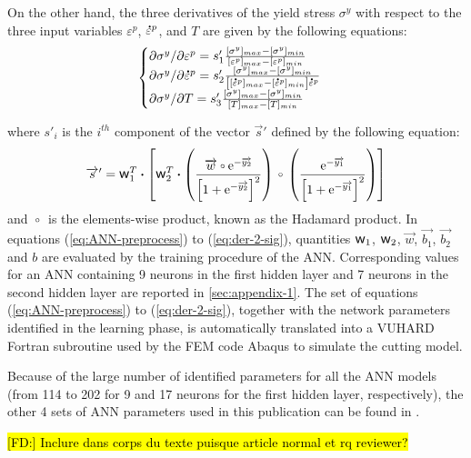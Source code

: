 \documentclass[preprint,12pt,times]{elsarticle}
\newcommand{\e}[1]{\mbox{\ensuremath{\mathrm{e}^{#1}}}}
\newcommand{\dotp}{\boldsymbol{\cdot}}
\newcommand{\w}{\mbox{\large\ensuremath{\mathsf{w}}}}
\newcommand{\mdot}[1]{\accentset{\mbox{\bfseries .}}{#1}} %
\newcommand{\ccirc}{\kern0.5ex\vcenter{\hbox{$\scriptstyle\circ$}}\kern0.5ex}
\DeclareRobustCommand{\FD}[1]{ {\begingroup\sethlcolor{VWgreen}\textcolor{black}{\hl{[FD:] #1}}\endgroup} }
\begin{document}
On the other hand, the three derivatives of the yield stress $\sigma^y$ with respect to the three input variables $\varepsilon^p$, $\mdot{\varepsilon}^p$, and $T$ are given by the following equations:
\begin{equation}
\begin{cases}
\partial \sigma^y/\partial \varepsilon^p = s'_1 \frac{[\sigma^y]_{max} -[\sigma^y]_{min}}{[\varepsilon^p]_{max} -[\varepsilon^p]_{min}}\\
\partial \sigma^y/\partial\mdot{\varepsilon}^p = s'_2 \frac{[\sigma^y]_{max} -[\sigma^y]_{min}}{\left[[\mdot{\varepsilon}^p]_{max} -[\mdot{\varepsilon}^p]_{min}\right]\mdot{\varepsilon}^p}\\
\partial \sigma^y/\partial T = s'_3 \frac{[\sigma^y]_{max} -[\sigma^y]_{min}}{[T]_{max} -[T]_{min}}
\end{cases}\label{eq:derivatives-ANN}
\end{equation}

where $s'_i$ is the $i^{th}$ component of the vector $\overrightarrow{s}'$ defined by the following equation:
\begin{equation}
\overrightarrow{s}' =\w_1^T \dotp \left[\w_2^T \dotp \left( 
\frac{\overrightarrow{w} \ccirc \e{-\overrightarrow{y_2}}}
{\left[1 + \e{-\overrightarrow{y_2}}\right]^2}\right)\ccirc \left(\frac{
\e{-\overrightarrow{y_1}}}
{\left[1 + \e{-\overrightarrow{y_1}}\right]^2}
\right)\right]\label{eq:der-2-sig}
\end{equation}
and $\ccirc$ is the elements-wise product, known as the Hadamard product.
In equations (\ref{eq:ANN-preprocess}) to (\ref{eq:der-2-sig}), quantities $\w_1$, $\w_2$, $\overrightarrow{w}$, $\overrightarrow{b_1}$, $\overrightarrow{b_2}$ and $b$ are evaluated by the training procedure of the ANN. Corresponding values for an ANN containing 9 neurons in the first hidden layer and 7 neurons in the second hidden layer are reported in \ref{sec:appendix-1}.
The set of equations (\ref{eq:ANN-preprocess}) to (\ref{eq:der-2-sig}), together with the network parameters identified in the learning phase, is automatically translated into a VUHARD Fortran subroutine used by the FEM code Abaqus to simulate the cutting model.

Because of the large number of identified parameters for all the ANN models (from 114 to 202 for 9 and 17 neurons for the first hidden layer, respectively), the other 4 sets of ANN parameters used in this publication can be found in \cite{pantale_Coefficients_2022}.

\FD{Inclure dans corps du texte puisque article normal et rq reviewer?}
\end{document}
